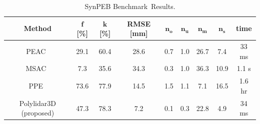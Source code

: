 \begin{table}[H]
\centering
\caption{SynPEB Benchmark~Results.  }
\label{table:ch3_synpeb_results}
\begin{tabular}{@{}ccccccccc@{}}
\toprule
\textbf{Method}                                  & $\textbf{f}$ {\textbf{[}}\textbf{\%}{\textbf{]}} & $\textbf{k}$ {\textbf{[}}\textbf{\%}{\textbf{]}} & \textbf{RMSE} {\textbf{[}}\textbf{mm}{\textbf{]}} & $\textbf{n}_\textbf{o}$ & $\textbf{n}_\textbf{u}$ & $\textbf{n}_\textbf{m}$ & $\textbf{n}_\textbf{s}$ & \textbf{time}\\ \midrule
PEAC~\cite{feng_fast_2014}              & 29.1         & 60.4         & 28.6          & 0.7   & 1.0   & 26.7  & 7.4   & 33 ms\\
MSAC~\cite{torr_mlesac_2000}            & 7.3          & 35.6         & 34.3          & 0.3   & 1.0   & 36.3  & 10.9  & 1.1 s\\
PPE~\cite{schaefer_maximum_2019}      & 73.6         & 77.9         & 14.5          & 1.5   & 1.1   & 7.1   & 16.5  & 1.6 hr\\
Polylidar3D (proposed)                  & 47.3         & 78.3         & 7.2           & 0.1   & 0.3   & 22.8  & 4.9  & 34 ms\\ \bottomrule
\end{tabular}
\end{table}






